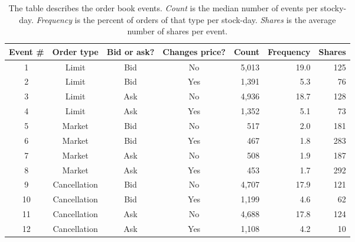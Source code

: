 \begin{table}[t]
\small
\linespread{1}
\centering
\captionsetup{position=below, font=footnotesize, justification=justified, width=\linewidth}
\caption[Order book event definitions]{The table describes the order book events. \textit{Count} is the median number of events per stocky-day. \textit{Frequency} is the percent of orders of that type per stock-day. \textit{Shares} is the average number of shares per event.}
\label{tab:event_definitions}
\begin{tabular*}{\textwidth}{@{\extracolsep{\fill}}ccccrrr}
\toprule
Event \# & Order type & Bid or ask? & Changes price? & Count & Frequency & Shares \\
\midrule
1 & Limit & Bid & No & 5,013 & 19.0 & 125 \\
2 & Limit & Bid & Yes & 1,391 & 5.3 & 76 \\
3 & Limit & Ask & No & 4,936 & 18.7 & 128 \\
4 & Limit & Ask & Yes & 1,352 & 5.1 & 73 \\  %
5 & Market & Bid & No & 517 & 2.0 & 181 \\  %
6 & Market & Bid & Yes & 467 & 1.8 & 283 \\  %
7 & Market & Ask & No & 508 & 1.9 & 187 \\  %
8 & Market & Ask & Yes & 453 & 1.7 & 292 \\
9 & Cancellation & Bid & No & 4,707 & 17.9 & 121 \\
10 & Cancellation & Bid & Yes & 1,199 & 4.6 & 62 \\
11 & Cancellation & Ask & No & 4,688 & 17.8 & 124 \\
12 & Cancellation & Ask & Yes & 1,108 & 4.2 & 10 \\
\bottomrule
\end{tabular*}
\end{table}


